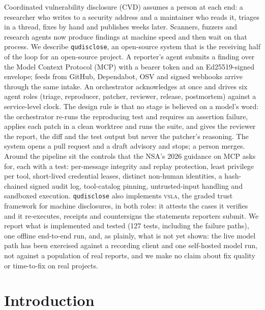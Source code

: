 \documentclass[11pt]{article}
\newcommand{\qud}{\texttt{qudisclose}}
\newcommand{\vsla}{\textsc{vsla}}
\begin{document}
\noindent\begin{minipage}{\textwidth}
{\linespread{1.06}\selectfont
Coordinated vulnerability disclosure (CVD) assumes a person at each end: a researcher who writes to a security
address and a maintainer who reads it, triages in a thread, fixes by hand and publishes weeks later. Scanners,
fuzzers and research agents now produce findings at machine speed and then wait on that process. We describe
\qud{}, an open-source system that is the receiving half of the loop for an open-source project. A reporter's
agent submits a finding over the Model Context Protocol (MCP) with a bearer token and an Ed25519-signed
envelope; feeds from GitHub, Dependabot, OSV and signed webhooks arrive through the same intake. An orchestrator
acknowledges at once and drives six agent roles (triage, reproducer, patcher, reviewer, release, postmortem)
against a service-level clock. The design rule is that no stage is believed on a model's word: the orchestrator
re-runs the reproducing test and requires an assertion failure, applies each patch in a clean worktree and runs
the suite, and gives the reviewer the report, the diff and the test output but never the patcher's reasoning.
The system opens a pull request and a draft advisory and stops; a person merges. Around the pipeline sit the
controls that the NSA's 2026 guidance on MCP asks for, each with a test: per-message integrity and replay
protection, least privilege per tool, short-lived credential leases, distinct non-human identities, a
hash-chained signed audit log, tool-catalog pinning, untrusted-input handling and sandboxed execution. \qud{}
also implements \vsla{}, the graded trust framework for machine disclosures, in both roles: it attests the cases
it verifies and it re-executes, receipts and countersigns the statements reporters submit. We report what is
implemented and tested (127 tests, including the failure paths), one offline end-to-end run, and, as plainly,
what is not yet shown: the live model path has been exercised against a recording client and one self-hosted
model run, not against a population of real reports, and we make no claim about fix quality or time-to-fix on
real projects.
\par}
\end{minipage}

\vspace{1.0em}
\noindent{\color{teal}\rule{\textwidth}{0.4pt}}
\setcounter{page}{1}

\section{Introduction}
\end{document}
